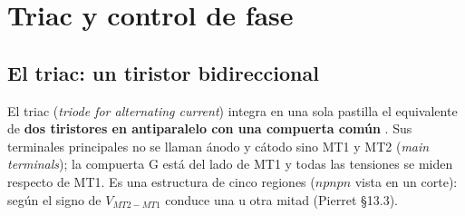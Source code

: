 \section{Triac y control de fase}
\label{sec:triac}

\subsection{El triac: un tiristor bidireccional}

El triac (\emph{triode for alternating current}) integra en una sola pastilla el equivalente de
\textbf{dos tiristores en antiparalelo con una compuerta común} . Sus terminales principales
no se llaman ánodo y cátodo sino MT1 y MT2 (\emph{main terminals}); la compuerta G está del lado de MT1
y todas las tensiones se miden respecto de MT1. Es una estructura de cinco regiones ($npnpn$ vista en
un corte): según el signo de $V_{MT2-MT1}$ conduce una u otra mitad (Pierret §13.3).

